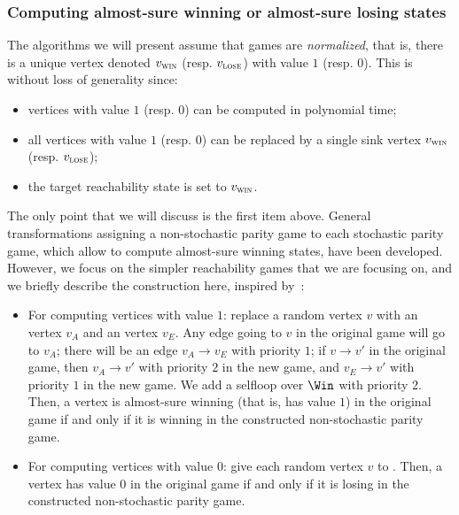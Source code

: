 \subsubsection{Computing almost-sure winning or almost-sure losing states}
\label{6-subsubsec:first}

The algorithms we will present assume that games are
\emph{normalized}, that is, there is a unique vertex denoted $v_{\textsc{win}}$
(resp. $v_{\textsc{lose}}$) with value $1$ (resp. $0$).  This is without loss of
generality since:
\begin{itemize}
\item vertices with value $1$ (resp. $0$) can be computed in
  polynomial time;
\item all vertices with value $1$ (resp. $0$) can be replaced by a
  single sink vertex $v_{\textsc{win}}$ (resp. $v_{\textsc{lose}}$);
\item the target reachability state is set to $v_{\textsc{win}}$.
\end{itemize}

The only point that we will discuss is the first item above. General
transformations assigning a non-stochastic parity game to each
stochastic parity game, which allow to compute almost-sure winning
states, have been developed.  However, we focus on the simpler reachability
games that we are focusing on, and we briefly describe the
construction here, inspired by~\cite{paulin-nathalie}:
\begin{itemize}
\item For computing vertices with value $1$: replace a random vertex
  $v$ with an \Adam vertex $v_A$ and an \Eve vertex $v_E$. Any edge
  going to $v$ in the original game will go to $v_A$; there will be an
  edge $v_A \to v_E$ with priority $1$; if $v \to v'$ in the original
  game, then $v_A \to v'$ with priority $2$ in the new game, and $v_E
  \to v'$ with priority $1$ in the new game. We add a selfloop over
  $\Win$ with priority $2$. Then, a vertex is almost-sure winning
  (that is, has value $1$) in the original game if and only if it is
  winning in the constructed non-stochastic parity game.
\item For computing vertices with value $0$: give each random vertex
  $v$ to \Adam. Then, a vertex has value $0$ in the original game if
  and only if it is losing in the constructed non-stochastic parity
  game.
\end{itemize}



